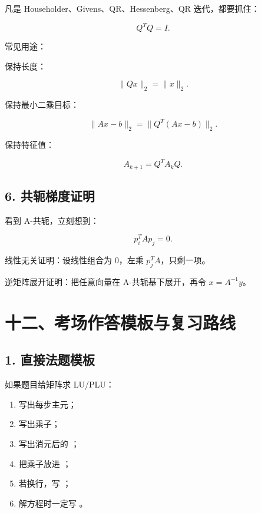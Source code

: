 \documentclass[11pt,a4paper]{ctexart}
\newcommand{\code}[1]{\begingroup\ttfamily\small #1\endgroup}
\begin{document}

凡是 Householder、Givens、QR、Hessenberg、QR 迭代，都要抓住：

\[
Q^TQ=I.
\]

常见用途：

保持长度：

\[
\|Qx\|_2=\|x\|_2.
\]

保持最小二乘目标：

\[
\|Ax-b\|_2=\|Q^T(Ax-b)\|_2.
\]

保持特征值：

\[
A_{k+1}=Q^TA_kQ.
\]


\subsection*{6. 共轭梯度证明}


看到 A-共轭，立刻想到：

\[
p_i^TAp_j=0.
\]

线性无关证明：设线性组合为 0，左乘 $p_j^TA$，只剩一项。

逆矩阵展开证明：把任意向量在 A-共轭基下展开，再令 $x=A^{-1}y$。


\section*{十二、考场作答模板与复习路线}



\subsection*{1. 直接法题模板}


如果题目给矩阵求 LU/PLU：

\begin{enumerate}

\item 写出每步主元；

\item 写出乘子；

\item 写出消元后的 \code{}；

\item 把乘子放进 \code{}；

\item 若换行，写 \code{}；

\item 解方程时一定写 \code{}。

\end{enumerate}
\end{document}
